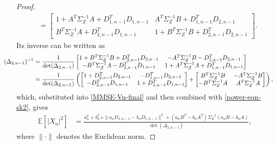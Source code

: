\documentclass[12pt]{article}
\newcommand{\E}{\mathbb{E}}
\begin{document}
\begin{proof}
\begin{equation*}
\begin{aligned}
&=\begin{bmatrix}
1+A^T\Sigma_Z^{-1}A +D_{1,n-1}^TD_{1,n-1} & A^T\Sigma_Z^{-1}B+D_{1,n-1}^TD_{2,n-1}\\[2pt]
B^T\Sigma_Z^{-1}A +D^T_{2,n-1}D_{1,n-1}   & 1+B^T\Sigma_Z^{-1}B+D_{2,n-1}^TD_{2,n-1}
\end{bmatrix}.
\end{aligned}
\end{equation*}
Its inverse can be written as
\begin{equation*}
\hspace{-0.8cm}
\begin{aligned}
 (\Delta_{2,n-1})^{-1}&=\frac{1}{\det(\Delta_{2,n-1})}\begin{bmatrix}
    1+B^T\Sigma_Z^{-1}B+D_{2,n-1}^TD_{2,n-1}& -A^T\Sigma_Z^{-1}B-D_{1,n-1}^TD_{2,n-1}\\
    -B^T\Sigma_Z^{-1}A -D^T_{2,n-1}D_{1,n-1}&1+A^T\Sigma_Z^{-1}A +D_{1,n-1}^TD_{1,n-1}
 \end{bmatrix}\\
 &=\frac{1}{\det(\Delta_{2,n-1})}\left(\begin{bmatrix}1+D_{2,n-1}^TD_{2,n-1} & -D^T_{1,n-1}D_{2,n-1}\\ -D^T_{2,n-1}D_{1,n-1} & 1+D_{1,n-1}^TD_{1,n-1}\end{bmatrix} +\begin{bmatrix}B^T\Sigma_Z^{-1}B & -A^T\Sigma_Z^{-1}B \\ -B^T\Sigma_Z^{-1}A & A^T\Sigma_Z^{-1}A \end{bmatrix}              \right),
\end{aligned}
\end{equation*}
which, substituted into \eqref{MMSE-Vn-final} and then combined with \eqref{power-eqn-sk2}, gives
\begin{equation}\label{MMSE-Vn2}
\begin{aligned}
 \E[|X_n|^2]&= \frac{a_n^2+b_n^2+\|a_nD_{2,n-1}-b_nD_{1,n-1} \|^2+(a_nB^T-b_nA^T)\Sigma_Z^{-1}(a_nB-b_nA)}{\det(\Delta_{2,n-1})},
\end{aligned}
\end{equation}
where $\|\cdot\|$ denotes the Euclidean norm.


\end{proof}
\end{document}
